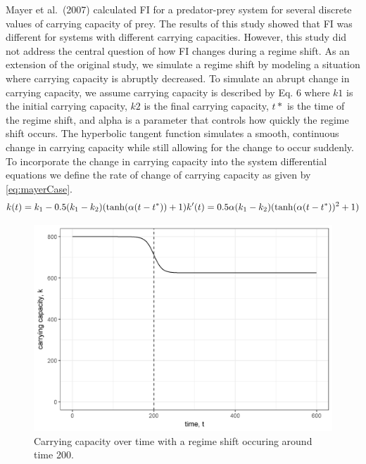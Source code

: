 \documentclass[12pt,twoside,openany]{reedthesis}
\begin{document}
Mayer et al.~(2007) calculated FI for a predator-prey system for several discrete values of carrying capacity of prey. The results of this study showed that FI was different for systems with different carrying capacities. However, this study did not address the central question of how FI changes during a regime shift. As an extension of the original study, we simulate a regime shift by modeling a situation where carrying capacity is abruptly decreased. To simulate an abrupt change in carrying capacity, we assume carrying capacity is described by Eq. 6 where \(k1\) is the initial carrying capacity, \(k2\) is the final carrying capacity, \(t*\) is the time of the regime shift, and alpha is a parameter that controls how quickly the regime shift occurs. The hyperbolic tangent function simulates a smooth, continuous change in carrying capacity while still allowing for the change to occur suddenly. To incorporate the change in carrying capacity into the system differential equations we define the rate of change of carrying capacity as given by \eqref{eq:mayerCase}.\\
\begin{equation}  
  k(t) = k_1  - 0.5(k_1-k_2)(\tanh(\alpha (t-t^*))+1)     \\
  k'(t) = 0.5\alpha (k_1-k_2)(\tanh(\alpha(t-t^*))^2 +1)      \\ 
\label{eq:mayerCase}
\end{equation}
\begin{figure}

{\centering \includegraphics[width=0.85\linewidth]{./chapterFiles/fiGuide/figures/kByTime} 

}

\caption{Carrying capacity over time with a regime shift occuring around time 200.}\label{fig:kByTime}
\end{figure}
\end{document}
